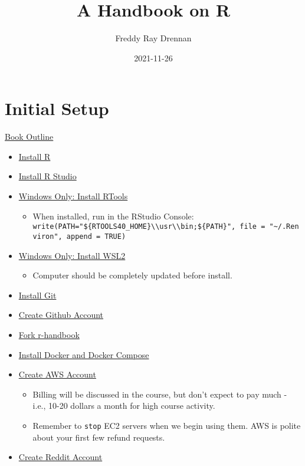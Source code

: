 \documentclass[
]{book}
\title{A Handbook on R}
\author{Freddy Ray Drennan}
\date{2021-11-26}
\providecommand{\tightlist}{%
  \setlength{\itemsep}{0pt}\setlength{\parskip}{0pt}}
\begin{document}
\maketitle

{
\setcounter{tocdepth}{1}
\tableofcontents
}
\hypertarget{initial-setup}{%
\chapter{Initial Setup}\label{initial-setup}}

\href{https://hackmd.io/vGRGEPo8QQyiG8gecWv71g}{Book Outline}

\begin{itemize}
\item
  \href{https://cran.r-project.org/}{Install R}
\item
  \href{https://www.rstudio.com/products/rstudio/download/}{Install R Studio}
\item
  \href{https://cran.r-project.org/bin/windows/Rtools/}{Windows Only: Install RTools}

  \begin{itemize}
  \tightlist
  \item
    When installed, run in the RStudio Console: \texttt{write(\textquotesingle{}PATH="\$\{RTOOLS40\_HOME\}\textbackslash{}\textbackslash{}usr\textbackslash{}\textbackslash{}bin;\$\{PATH\}"\textquotesingle{},\ file\ =\ "\textasciitilde{}/.Renviron",\ append\ =\ TRUE)}
  \end{itemize}
\item
  \href{https://www.omgubuntu.co.uk/how-to-install-wsl2-on-windows-10}{Windows Only: Install WSL2}

  \begin{itemize}
  \tightlist
  \item
    Computer should be completely updated before install.
  \end{itemize}
\item
  \href{https://git-scm.com/downloads}{Install Git}
\item
  \href{https://github.com/}{Create Github Account}
\item
  \href{https://github.com/fdrennan/r-handbook}{Fork r-handbook}
\item
  \href{https://docs.docker.com/get-docker/}{Install Docker and Docker Compose}
\item
  \href{https://aws.amazon.com/}{Create AWS Account}

  \begin{itemize}
  \tightlist
  \item
    Billing will be discussed in the course, but don't expect to pay much - i.e., 10-20 dollars a month for high course activity.
  \item
    Remember to \texttt{stop} EC2 servers when we begin using them. AWS is polite about your first few refund requests.
  \end{itemize}
\item
  \href{reddit.com}{Create Reddit Account}


\end{itemize}
\end{document}
